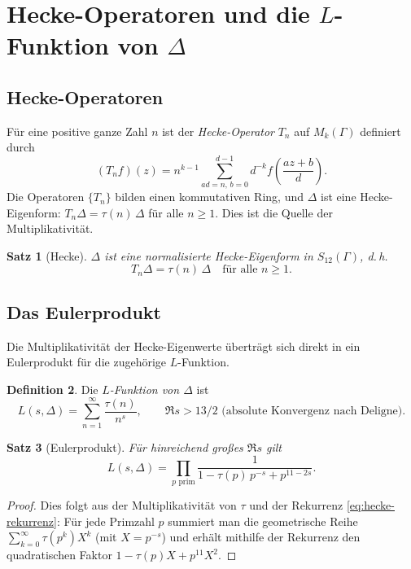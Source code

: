 \documentclass[12pt,a4paper]{amsart}
\newtheorem{theorem}{Satz}[section]
\theoremstyle{definition}
\newtheorem{definition}[theorem]{Definition}
\begin{document}
\section{Hecke-Operatoren und die $L$-Funktion von $\Delta$}
\label{sec:hecke}

\subsection{Hecke-Operatoren}

Für eine positive ganze Zahl $n$ ist der \emph{Hecke-Operator} $T_n$ auf
$M_k(\Gamma)$ definiert durch
\[
  (T_n f)(z) = n^{k-1} \sum_{ad=n,\, b=0}^{d-1}
  d^{-k} f\!\left(\frac{az+b}{d}\right).
\]
Die Operatoren $\{T_n\}$ bilden einen kommutativen Ring, und $\Delta$ ist eine
Hecke-Eigenform: $T_n \Delta = \tau(n)\, \Delta$ für alle $n \geq 1$. Dies ist die
Quelle der Multiplikativität.

\begin{theorem}[Hecke]\label{thm:hecke-eigenform}
  $\Delta$ ist eine normalisierte Hecke-Eigenform in $S_{12}(\Gamma)$, d.\,h.
  \[
    T_n \Delta = \tau(n)\, \Delta \quad \text{für alle } n \geq 1.
  \]
\end{theorem}

\subsection{Das Eulerprodukt}

Die Multiplikativität der Hecke-Eigenwerte überträgt sich direkt in ein Eulerprodukt
für die zugehörige $L$-Funktion.

\begin{definition}
  Die \emph{$L$-Funktion von $\Delta$} ist
  \[
    L(s, \Delta) = \sum_{n=1}^{\infty} \frac{\tau(n)}{n^s},
    \qquad \Re s > 13/2 \text{ (absolute Konvergenz nach Deligne).}
  \]
\end{definition}

\begin{theorem}[Eulerprodukt]\label{thm:eulerprodukt}
  Für hinreichend großes $\Re s$ gilt
  \begin{equation}\label{eq:eulerprodukt}
    L(s, \Delta)
    = \prod_{p \text{ prim}}
      \frac{1}{1 - \tau(p)\,p^{-s} + p^{11-2s}}.
  \end{equation}
\end{theorem}

\begin{proof}
  Dies folgt aus der Multiplikativität von $\tau$ und der Rekurrenz
  \eqref{eq:hecke-rekurrenz}: Für jede Primzahl $p$ summiert man die geometrische
  Reihe $\sum_{k=0}^\infty \tau(p^k) X^k$ (mit $X = p^{-s}$) und erhält mithilfe
  der Rekurrenz den quadratischen Faktor $1 - \tau(p)X + p^{11}X^2$.
\end{proof}
\end{document}
